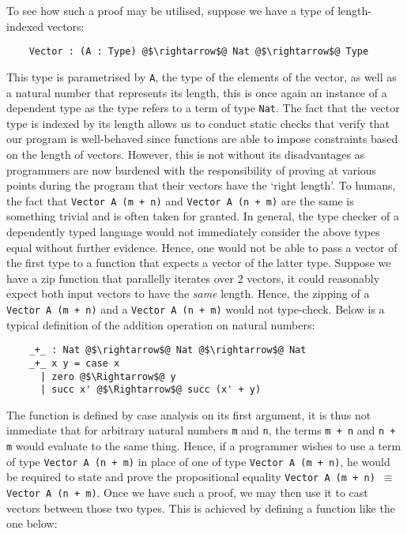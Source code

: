 \documentclass[12pt,twoside,maitrise]{dms}
\theoremstyle{definition}
\numberwithin{equation}{section}
\numberwithin{table}{chapter}
\numberwithin{figure}{chapter}
\newcommand\fn[1] {\texttt{#1}}
\begin{document}
To see how such a proof may be utilised, suppose we have a type of
length-indexed vectors:

\begin{verbatim}
    Vector : (A : Type) @$\rightarrow$@ Nat @$\rightarrow$@ Type
\end{verbatim}

This type is parametrised by \fn{A}, the type of the elements of the vector, as
well as a natural number that represents its length, this is once again an
instance of a dependent type as the type refers to a term of type \fn{Nat}. The
fact that the vector type is indexed by its length allows us to conduct static
checks that verify that our program is well-behaved since functions are able to
impose constraints based on the length of vectors. However, this is not without
its disadvantages as programmers are now burdened with the responsibility of
proving at various points during the program that their vectors have the `right
length'. To humans, the fact that \fn{Vector A (m + n)} and \fn{Vector A (n +
  m)} are the same is something trivial and is often taken for granted. In
general, the type checker of a dependently typed language would not immediately
consider the above types equal without further evidence. Hence, one would not be
able to pass a vector of the first type to a function that expects a vector of
the latter type. Suppose we have a zip function that parallelly iterates over 2
vectors, it could reasonably expect both input vectors to have the \emph{same}
length. Hence, the zipping of a \fn{Vector A (m + n)} and a \fn{Vector A (n +
  m)} would not type-check. Below is a typical definition of the addition
operation on natural numbers:

\begin{verbatim}
    _+_ : Nat @$\rightarrow$@ Nat @$\rightarrow$@ Nat
    _+_ x y = case x
      | zero @$\Rightarrow$@ y
      | succ x' @$\Rightarrow$@ succ (x' + y)
\end{verbatim}

The function is defined by case analysis on its first argument, it is thus not
immediate that for arbitrary natural numbers \fn{m} and \fn{n}, the terms \fn{m
  + n} and \fn{n + m} would evaluate to the same thing. Hence, if a programmer
wishes to use a term of type \fn{Vector A (n + m)} in place of one of type
\fn{Vector A (m + n)}, he would be required to state and prove the propositional
equality \fn{Vector A (m + n) $\equiv$ Vector A (n + m)}. Once we have such a
proof, we may then use it to cast vectors between those two types. This is
achieved by defining a function like the one below:
\end{document}
